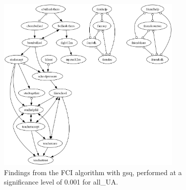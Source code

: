 \begin{figure}[htbp]
    \centering
    \includegraphics[width=0.8\textwidth]{FCI_gsq_0.001_all_UA.png}
    \caption{Findings from the FCI algorithm with gsq, performed at a significance level of 0.001 for all_UA.}
    \label{fig:fci_gsq_0.001all_UA}
\end{figure}
